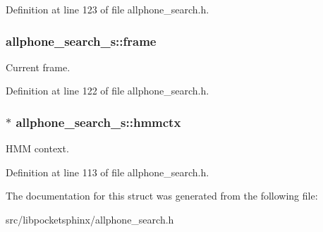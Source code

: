 Definition at line 123 of file allphone\-\_\-search.\-h.

\subsubsection[{frame}]{ allphone\-\_\-search\-\_\-s\-::frame}\label{structallphone__search__s_a458aad951cc506c072d67d8d9f163fd7}


Current frame. 



Definition at line 122 of file allphone\-\_\-search.\-h.

\subsubsection[{hmmctx}]{$\ast$ allphone\-\_\-search\-\_\-s\-::hmmctx}\label{structallphone__search__s_aa82fce72da16af69af92aeca29beed3d}


H\-M\-M context. 



Definition at line 113 of file allphone\-\_\-search.\-h.



The documentation for this struct was generated from the following file\-:\begin{DoxyCompactItemize}
\item 
src/libpocketsphinx/allphone\-\_\-search.\-h\end{DoxyCompactItemize}
